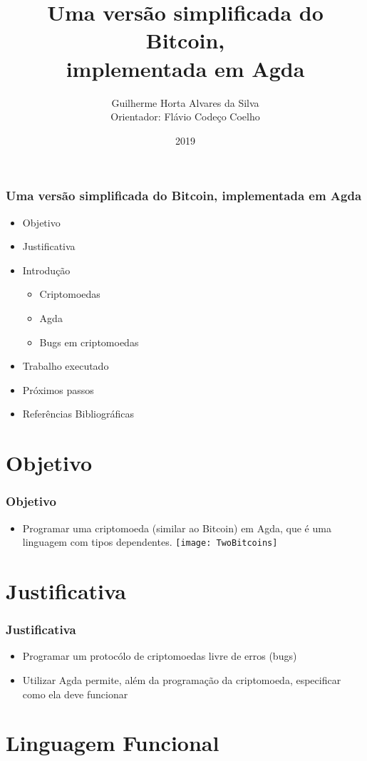 \documentclass{beamer}
\title{Uma versão simplificada do Bitcoin, \\
  implementada em Agda}
\author[Guilherme, Flávio]{Guilherme Horta Alvares da Silva \\
  Orientador: Flávio Codeço Coelho}
\institute{Fundação Getulio Vargas}
\date{2019}
\begin{document}
 
\frame{\titlepage}

\begin{frame}
  \frametitle{Uma versão simplificada do Bitcoin, implementada em Agda}
\begin{itemize}
  \item Objetivo
  \item Justificativa
  \item Introdução
  \begin{itemize}
    \item Criptomoedas
    \item Agda
    \item Bugs em criptomoedas
  \end{itemize}
  \item Trabalho executado
  \item Próximos passos
  \item Referências Bibliográficas
\end{itemize}
\end{frame}

\section{Objetivo}

 \begin{frame}
\frametitle{Objetivo}
\begin{itemize}
  \item Programar uma criptomoeda (similar ao Bitcoin) em Agda, que é uma linguagem com tipos dependentes.
    \texttt{[image: TwoBitcoins]}
\end{itemize}
\end{frame}
 
\section{Justificativa}

\begin{frame}
\frametitle{Justificativa}
\begin{itemize}
    \item Programar um protocólo de criptomoedas livre de erros (bugs)
    \item Utilizar Agda permite, além da programação da criptomoeda, especificar como ela deve funcionar
      \cite{norell2008dependently}
\end{itemize}
\end{frame}

\section{Linguagem Funcional}
\end{document}

